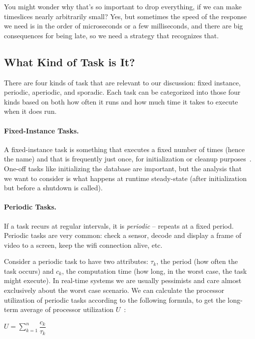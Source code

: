 You might wonder why that's so important to drop everything, if we can make timeslices nearly arbitrarily small? Yes, but sometimes the speed of the response we need is in the order of microseconds or a few milliseconds, and there are big consequences for being late, so we need a strategy that recognizes that. 

\subsection*{What Kind of Task is It?}

There are four kinds of task that are relevant to our discussion: fixed instance, periodic, aperiodic, and sporadic. Each task can be categorized into those four kinds based on both how often it runs and how much time it takes to execute when it does run. 

\paragraph{Fixed-Instance Tasks.} A fixed-instance task is something that executes a fixed number of times (hence the name) and that is frequently just once, for initialization or cleanup purposes~\cite{mte241}. One-off tasks like initializing the database are important, but the analysis that we want to consider is what happens at runtime steady-state (after initialization but before a shutdown is called).  


\paragraph{Periodic Tasks.} If a task recurs at regular intervals, it is \textit{periodic} -- repeats at a fixed period. Periodic tasks are very common: check a sensor, decode and display a frame of video to a screen, keep the wifi connection alive, etc.

Consider a periodic task to have two attributes: $\tau_{k}$, the period (how often the task occurs) and $c_{k}$, the computation time (how long, in the worst case, the task might execute). In real-time systems we are usually pessimists and care almost exclusively about the worst case scenario. We can calculate the processor utilization of periodic tasks according to the following formula, to get the long-term average of processor utilization $U$~\cite{mte241}:

\begin{center}
$U = \sum\limits_{k=1}^n\dfrac{c_{k}}{\tau_{k}}$
\end{center}

